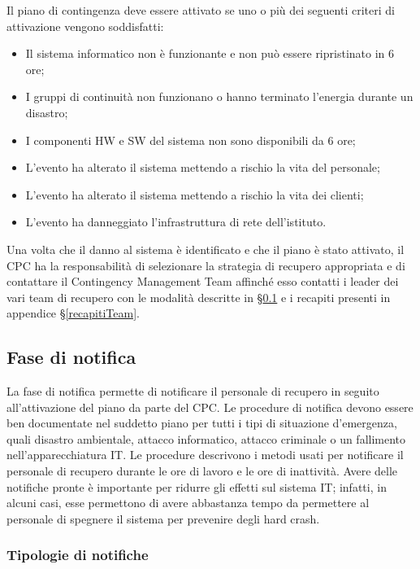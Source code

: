\documentclass[12pt, a4paper, titlepage]{report}
\begin{document}
	Il piano di contingenza deve essere attivato se uno o più dei seguenti criteri di attivazione vengono soddisfatti:
	\begin{itemize}
		\item Il sistema informatico non è funzionante e non può essere ripristinato in 6 ore;
		\item I gruppi di continuità non funzionano o hanno terminato l'energia durante un disastro;
		\item I componenti HW e SW del sistema non sono disponibili da 6 ore;
		\item L'evento ha alterato il sistema mettendo a rischio la vita del personale;
		\item L'evento ha alterato il sistema mettendo a rischio la vita dei clienti;
		\item L'evento ha danneggiato l'infrastruttura di rete dell'istituto.
	\end{itemize}
	Una volta che il danno al sistema è identificato e che il piano è stato attivato, il CPC ha la responsabilità di selezionare la strategia di recupero appropriata e di contattare il Contingency Management Team affinché esso contatti i leader dei vari team di recupero con le modalità descritte in §\ref{notifica} e i recapiti presenti in appendice §\ref{recapitiTeam}.


	\subsection{Fase di notifica} \label{notifica}
	
	La fase di notifica permette di notificare il personale di recupero in seguito all'attivazione del piano da parte del CPC. Le procedure di notifica devono essere ben documentate nel suddetto piano per tutti i tipi di situazione d'emergenza, quali disastro ambientale, attacco informatico, attacco criminale o un fallimento nell'apparecchiatura IT. Le procedure descrivono i metodi usati per notificare il personale di recupero durante le ore di lavoro e le ore di inattività. Avere delle notifiche pronte è importante per ridurre gli effetti sul sistema IT; infatti, in alcuni casi, esse permettono di avere abbastanza tempo da permettere al personale di spegnere il sistema per prevenire degli hard crash.
	
	\subsubsection{Tipologie di notifiche} \label{procedure}
	
\end{document}
